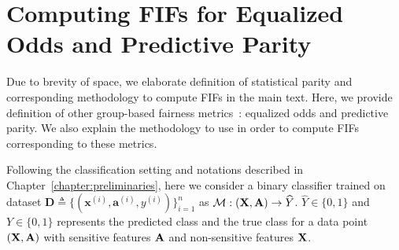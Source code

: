 \section{Computing FIFs for Equalized Odds and Predictive Parity}\label{fairness_fairXplainer_app:pp}
Due to brevity of space, we elaborate definition of statistical parity and corresponding methodology to compute FIFs in the main text. Here, we provide definition of other group-based fairness metrics~\cite{verma2018fairness}: equalized odds and predictive parity. We also explain the methodology to use {\fairXplainer} in order to compute FIFs corresponding to these metrics.

Following the classification setting and notations described in Chapter~\ref{chapter:preliminaries}, here we consider a binary classifier trained on dataset $\mathbf{D}\triangleq \{(\mathbf{x}^{(i)}, \mathbf{a}^{(i)}, y^{(i)})\}_{i=1}^n$ as $\mathcal{M}: (\mathbf{X}, \mathbf{A}) \rightarrow \widehat{Y} $. $\widehat{Y} \in \{0,1\}$ and ${Y} \in \{0,1\}$ represents the predicted class and the true class for a data point $ (\mathbf{X}, \mathbf{A}) $ with sensitive features $\mathbf{A}$ and non-sensitive features $\mathbf{X}$.


